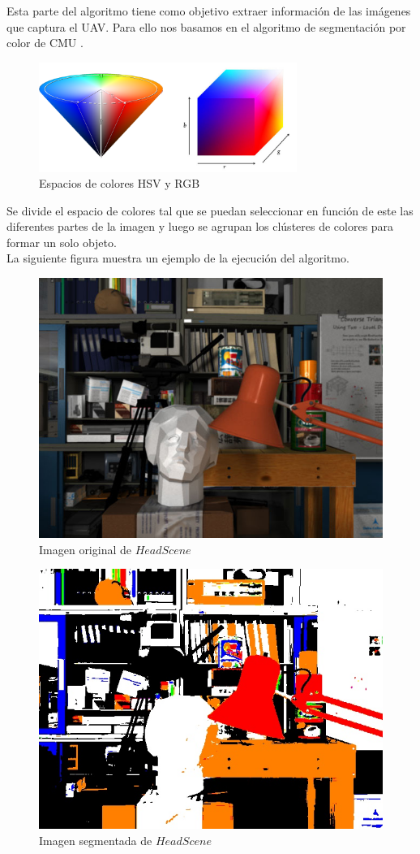 Esta parte del algoritmo tiene como objetivo extraer información de las imágenes que captura el UAV. Para ello nos basamos en el algoritmo de segmentación por color de CMU \cite{JamesBruce_CMU_SEG}.  \\

\begin{figure}[h]
	\centering
	\includegraphics[width=0.75\textwidth,natwidth=944,natheight=400]{../Images/c2/HSV_vs_RGB.png}
	\caption{Espacios de colores HSV y RGB}
	\label{fig:HSV_vs_RGB}
\end{figure}

Se divide el espacio de colores tal que se puedan seleccionar en función de este las diferentes partes de la imagen y luego se agrupan los cl\'usteres de colores para formar un solo objeto. \\

La siguiente figura muestra un ejemplo de la ejecuci\'on del algoritmo.

\begin{figure}[hbp]
	\centering
	\includegraphics[width=0.4\linewidth]{../Images/c2/head_scene_tsukuba_ori}
	\caption{Imagen original de $Head Scene$}
	\label{fig:head_scene_tsukuba_ori}
\end{figure}

\begin{figure}[htp]
	\centering
	\includegraphics[width=0.4\linewidth]{../Images/c2/head_scene_tsukuba_seg}
	\caption{Imagen segmentada de $Head Scene$}
	\label{fig:head_scene_tsukuba_seg}
\end{figure}
